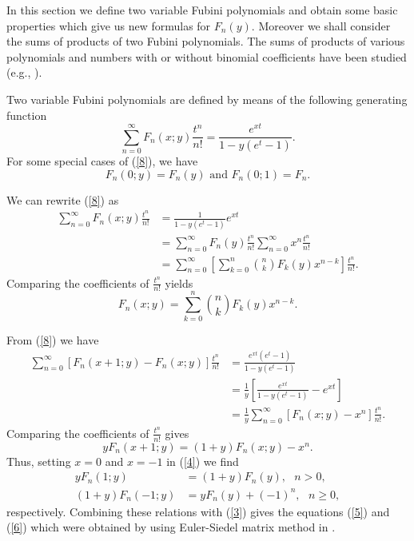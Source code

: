 \documentclass{article}%
\begin{document}
In this section we define two variable Fubini polynomials and obtain some
basic properties which give us new formulas for $F_{n}\left(  y\right)  .$
Moreover we shall consider the sums of products of two Fubini polynomials. The
sums of products of various polynomials and numbers with or without binomial
coefficients have been studied (e.g., \cite{Agoh, Kamano, Komatsu, Komatsu2,
Singh, Zhao}).

Two variable Fubini polynomials are defined by means of the following
generating function%
\begin{equation}
\sum_{n=0}^{\infty}F_{n}\left(  x;y\right)  \frac{t^{n}}{n!}=\frac{e^{xt}%
}{1-y\left(  e^{t}-1\right)  }. \label{8}%
\end{equation}
For some special cases of (\ref{8}), we have%
\begin{equation}
F_{n}\left(  0;y\right)  =F_{n}\left(  y\right)  \text{ and }F_{n}\left(
0;1\right)  =F_{n}. \label{29}%
\end{equation}


We can rewrite (\ref{8}) as
\begin{align*}
\sum_{n=0}^{\infty}F_{n}\left(  x;y\right)  \frac{t^{n}}{n!}  &  =\frac
{1}{1-y\left(  e^{t}-1\right)  }e^{xt}\\
&  =\sum_{n=0}^{\infty}F_{n}\left(  y\right)  \frac{t^{n}}{n!}\sum
_{n=0}^{\infty}x^{n}\frac{t^{n}}{n!}\\
&  =\sum_{n=0}^{\infty}\left[  \sum_{k=0}^{n}\binom{n}{k}F_{k}\left(
y\right)  x^{n-k}\right]  \frac{t^{n}}{n!}.
\end{align*}
Comparing the coefficients of $\frac{t^{n}}{n!}$ yields%
\begin{equation}
F_{n}\left(  x;y\right)  =\sum_{k=0}^{n}\binom{n}{k}F_{k}\left(  y\right)
x^{n-k}. \label{3}%
\end{equation}


From (\ref{8}) we have
\begin{align*}
\sum_{n=0}^{\infty}\left[  F_{n}\left(  x+1;y\right)  -F_{n}\left(
x;y\right)  \right]  \frac{t^{n}}{n!}  &  =\frac{e^{xt}\left(  e^{t}-1\right)
}{1-y\left(  e^{t}-1\right)  }\\
&  =\frac{1}{y}\left[  \frac{e^{xt}}{1-y\left(  e^{t}-1\right)  }%
-e^{xt}\right] \\
&  =\frac{1}{y}\sum_{n=0}^{\infty}\left[  F_{n}\left(  x;y\right)
-x^{n}\right]  \frac{t^{n}}{n!}.
\end{align*}
Comparing the coefficients of $\frac{t^{n}}{n!}$ gives
\begin{equation}
yF_{n}\left(  x+1;y\right)  =\left(  1+y\right)  F_{n}\left(  x;y\right)
-x^{n}. \label{4}%
\end{equation}
Thus, setting $x=0$ and $x=-1$ in (\ref{4}) we find
\begin{align}
yF_{n}\left(  1;y\right)   &  =\left(  1+y\right)  F_{n}\left(  y\right)
,\text{ \ }n>0,\label{7}\\
\left(  1+y\right)  F_{n}\left(  -1;y\right)   &  =yF_{n}\left(  y\right)
+\left(  -1\right)  ^{n},\text{ \ }n\geq0, \label{9}%
\end{align}
respectively. Combining these relations with (\ref{3}) gives the equations
(\ref{5}) and (\ref{6}) which were obtained by using Euler-Siedel matrix
method in \cite{Diletal}.
\end{document}
